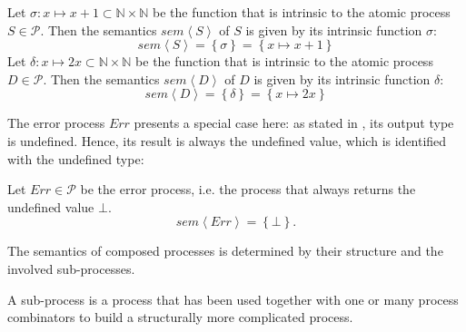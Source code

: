 \begin{example}
  \label{exp:sem_atomic}
  Let $\sigma \colon x \mapsto x+1 \subset \mathbb{N} \times \mathbb{N}$ be the function that is intrinsic to the atomic process $S \in \mathcal{P}$. Then the semantics $sem \left\langle S \right\rangle$ of $S$ is given by its intrinsic function $\sigma$:
  \begin{equation}
    sem \left\langle S \right\rangle = \left\{ \sigma \right\} = \left\{ x \mapsto x+1 \right\}
  \end{equation}
  Let $\delta \colon x \mapsto 2x \subset \mathbb{N} \times \mathbb{N}$ be the function that is intrinsic to the atomic process $D \in \mathcal{P}$. Then the semantics $sem \left\langle D \right\rangle$ of $D$ is given by its intrinsic function $\delta$:
  \begin{equation}
    sem \left\langle D \right\rangle = \left\{ \delta \right\} = \left\{ x \mapsto 2x \right\}
  \end{equation}
  \hfill\qedsymbol
\end{example}


The error process $Err$ presents a special case here: as stated in , its output type is undefined. Hence, its result is always the undefined value, which is identified with the undefined type:
\begin{definition}
\label{def:sem_err}
Let $Err \in \mathcal{P}$ be the error process, i.e. the process that always returns the undefined value $\bot$.
  \begin{equation}
    \label{eqn:sem_error}
    sem \left\langle Err \right\rangle = \left\{ \bot \right\}.
  \end{equation}
  \hfill\qedsymbol
\end{definition}

The semantics of composed processes is determined by their structure and the involved sub-processes. 

\begin{definition}
A sub-process is a process that has been used together with one or many process combinators to build a structurally more complicated process.

\hfill\qedsymbol
\end{definition}

